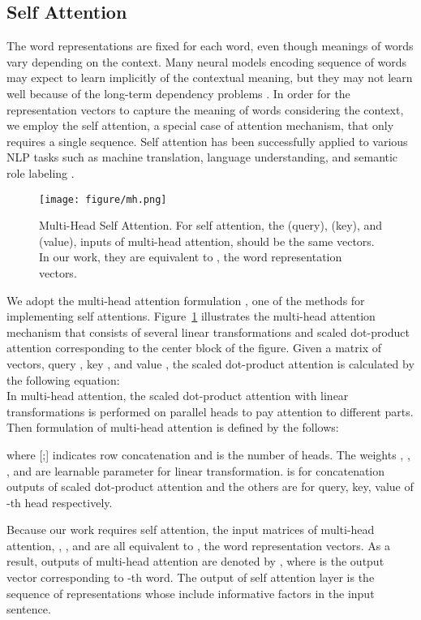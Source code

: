 \documentclass[twoside,leqno,twocolumn]{article}
\begin{document}
\subsection{Self Attention}
The word representations are fixed for each word, even though meanings of words vary depending on the context.
Many neural models encoding sequence of words may expect to learn implicitly of the contextual meaning, but they may not learn well because of the long-term dependency problems \cite{bengio1994learning}.
In order for the representation vectors to capture the meaning of words considering the context, we employ the self attention, a special case of attention mechanism, that only requires a single sequence.
Self attention has been successfully applied to various NLP tasks such as machine translation, language understanding, and semantic role labeling \cite{vaswani2017attention, shen2017disan, tan2017deep}.

\begin{figure}[!ht]
\centering
\texttt{[image: figure/mh.png]}
\caption{Multi-Head Self Attention. For self attention, the (query), (key), and (value), inputs of multi-head attention, should be the same vectors. In our work, they are equivalent to , the word representation vectors.}
\label{fig:mh}
\end{figure}

We adopt the multi-head attention formulation \cite{vaswani2017attention}, one of the methods for implementing self attentions.
Figure~\ref{fig:mh} illustrates the multi-head attention mechanism that consists of several linear transformations and scaled dot-product attention corresponding to the center block of the figure. 
Given a matrix of  vectors, query , key , and value , the scaled dot-product attention is calculated by the following equation:
\\
In multi-head attention, the scaled dot-product attention with linear transformations is performed on  parallel heads to pay attention to different parts.
Then formulation of multi-head attention is defined by the follows:


where [;] indicates row concatenation and  is the number of heads.
The weights , , , and  are learnable parameter for linear transformation.  is for concatenation outputs of scaled dot-product attention and the others are for query, key, value of -th head respectively.

Because our work requires self attention, the input matrices of multi-head attention, , , and  are all equivalent to , the word representation vectors. As a result, outputs of multi-head attention are denoted by , where  is the output vector corresponding to -th word.
The output of self attention layer is the sequence of representations whose include informative factors in the input sentence.
\end{document}
